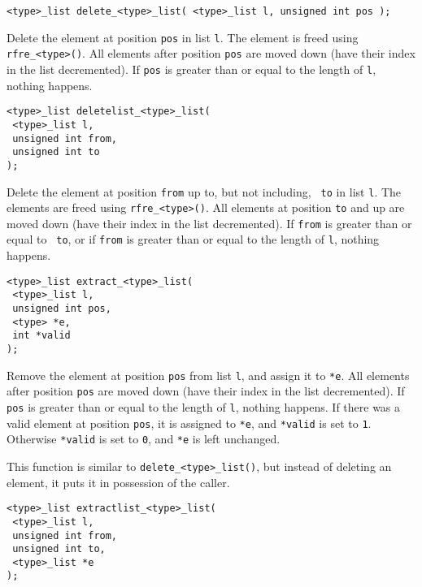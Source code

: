 \begin{verbatim}
<type>_list delete_<type>_list( <type>_list l, unsigned int pos );
\end{verbatim}
\begin{desc}
Delete the element at position {\tt pos} in list {\tt l}.
The element is freed using {\tt rfre\_<type>()}.
All elements after position {\tt pos} are moved down
(have their index in the list decremented).
If {\tt pos} is greater than or equal to the length of {\tt l},
nothing happens.
\end{desc}
\begin{verbatim}
<type>_list deletelist_<type>_list(
 <type>_list l,
 unsigned int from,
 unsigned int to
);
\end{verbatim}
\begin{desc}
Delete the element at position {\tt from} up to, but not including, {\tt
to} in list {\tt l}.  The elements are freed using {\tt rfre\_<type>()}.
All elements at position {\tt to} and up are moved down (have their index
in the list decremented).  If {\tt from} is greater than or equal to {\tt
to}, or if {\tt from} is greater than or equal to the length of {\tt l},
nothing happens.
\end{desc}
\begin{verbatim}
<type>_list extract_<type>_list(
 <type>_list l,
 unsigned int pos,
 <type> *e,
 int *valid
);
\end{verbatim}
\begin{desc}
Remove the element at position {\tt pos} from list {\tt l},
and assign it to \verb'*e'.
All elements after position {\tt pos} are moved down
(have their index in the list decremented).
If {\tt pos} is greater than or equal to the length of {\tt l},
nothing happens.
If there was a valid element at position {\tt pos}, it is assigned
to \verb'*e', and \verb'*valid' is set to {\tt 1}. Otherwise
\verb'*valid' is set to {\tt 0}, and \verb'*e' is left unchanged.
\par
This function is similar to \verb'delete_<type>_list()', but instead
of deleting an element, it puts it in possession of the caller.
\end{desc}
\begin{verbatim}
<type>_list extractlist_<type>_list(
 <type>_list l,
 unsigned int from,
 unsigned int to,
 <type>_list *e
);
\end{verbatim}
